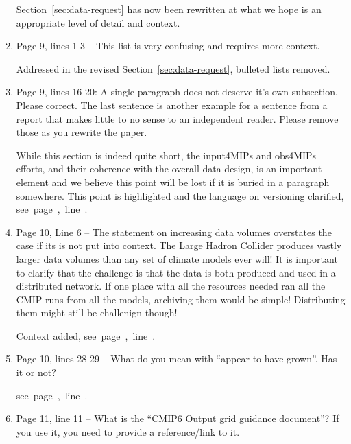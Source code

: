 \documentclass[gmd,manuscript]{copernicus}
\newcommand{\plref}[1]{\mbox{see page \pageref{p-#1}, line
    \lineref{l-#1}.}}
\newenvironment{answer}{\color{blue}}{}
\begin{document}
\begin{enumerate}[label=RC3-\arabic*,leftmargin=*]
  \begin{answer}
    Section~\ref{sec:data-request} has now been rewritten at what we
    hope is an appropriate level of detail and context.
  \end{answer}
\item Page 9, lines 1-3 -- This list is very confusing and requires
  more context.

  \begin{answer}
    Addressed in the revised Section~\ref{sec:data-request}, bulleted
    lists removed.
  \end{answer}
\item Page 9, lines 16-20: A single paragraph does not deserve it’s own
  subsection. Please correct. The last sentence is another example for
  a sentence from a report that makes little to no sense to an
  independent reader. Please remove those as you rewrite the paper.

  \begin{answer}
    While this section is indeed quite short, the input4MIPs and
    obs4MIPs efforts, and their coherence with the overall data
    design, is an important element and we believe this point will be
    lost if it is buried in a paragraph somewhere. This point is
    highlighted and the language on versioning clarified,
    \plref{RC3-9}
  \end{answer}
\item Page 10, Line 6 -- The statement on increasing data volumes
  overstates the case if its is not put into context. The Large Hadron
  Collider produces vastly larger data volumes than any set of climate
  models ever will! It is important to clarify that the challenge is
  that the data is both produced and used in a distributed network. If
  one place with all the resources needed ran all the CMIP runs from
  all the models, archiving them would be simple! Distributing them
  might still be challenign though!

  \begin{answer}
    Context added, \plref{RC3-10}
  \end{answer}
\item Page 10, lines 28-29 -- What do you mean with “appear to have
  grown”. Has it or not?

  \begin{answer}
    \plref{RC3-11}
  \end{answer}
\item Page 11, line 11 -- What is the “CMIP6 Output grid guidance
  document”? If you use it, you need to provide a reference/link to
  it.


\end{enumerate}
\end{document}
